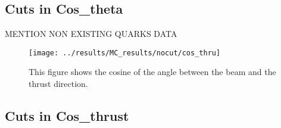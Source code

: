 \subsection{Cuts in Cos\_theta}
MENTION NON EXISTING QUARKS DATA


\begin{figure}[h]
\centering
\texttt{[image: ../results/MC\_results/nocut/cos\_thru]}
\caption[Cos\_thru in simulation data]{This figure shows the cosine of the angle between the beam and the thrust direction.}
\label{fig:cos_thru}
\end{figure}

\subsection{Cuts in Cos\_thrust}




